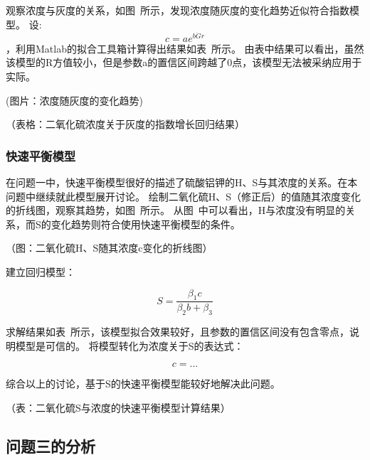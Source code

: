 观察浓度与灰度的关系，如图~所示，发现浓度随灰度的变化趋势近似符合指数模型。
设: $$c=ae^{b\dot Gr}$$，利用Matlab的拟合工具箱计算得出结果如表~所示。
由表中结果可以看出，虽然该模型的R方值较小，但是参数a的置信区间跨越了0点，该模型无法被采纳应用于实际。

(图片：浓度随灰度的变化趋势)

（表格：二氧化硫浓度关于灰度的指数增长回归结果）



\subsubsection{快速平衡模型}

在问题一中，快速平衡模型很好的描述了硫酸铝钾的H、S与其浓度的关系。在本问题中继续就此模型展开讨论。
绘制二氧化硫H、S（修正后）的值随其浓度变化的折线图，观察其趋势，如图~所示。
从图~中可以看出，H与浓度没有明显的关系，而S的变化趋势则符合使用快速平衡模型的条件。

（图：二氧化硫H、S随其浓度c变化的折线图）

建立回归模型：


   $$ S = \frac{\beta_1 c}{\beta_2b+\beta_3}$$


求解结果如表~所示，该模型拟合效果较好，且参数的置信区间没有包含零点，说明模型是可信的。
将模型转化为浓度关于S的表达式：


    $$c = ...$$


综合以上的讨论，基于S的快速平衡模型能较好地解决此问题。

（表：二氧化硫S与浓度的快速平衡模型计算结果）


\subsection{问题三的分析}
